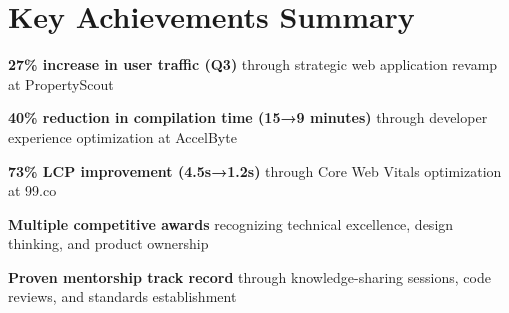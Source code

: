 \documentclass[a4paper, 11pt]{article}
\newcommand{\resumeSubHeadingListStart}{\begin{itemize}[leftmargin=0.1in, label={}]}
\newcommand{\resumeSubHeadingListEnd}{\end{itemize}\vspace{5pt}}
\begin{document}
\section{Key Achievements Summary}
    \resumeSubHeadingListStart
        \small{
            \item \textbf{27\% increase in user traffic (Q3)} through strategic web application revamp at PropertyScout
            \item \textbf{40\% reduction in compilation time (15→9 minutes)} through developer experience optimization at AccelByte
            \item \textbf{73\% LCP improvement (4.5s→1.2s)} through Core Web Vitals optimization at 99.co
            \item \textbf{Multiple competitive awards} recognizing technical excellence, design thinking, and product ownership
            \item \textbf{Proven mentorship track record} through knowledge-sharing sessions, code reviews, and standards establishment
        }
    \resumeSubHeadingListEnd
\end{document}
